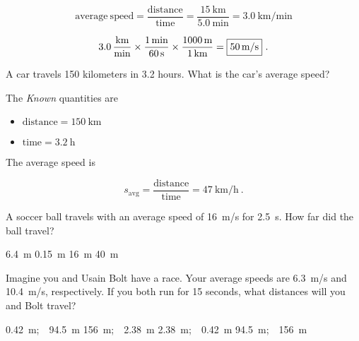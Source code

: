 \documentclass[]{exam}
\begin{document}
\begin{questions}
\begin{questions}
\begin{solution}
\begin{equation*}
    \mathrm{average\ speed = \frac{distance}{time}} = \frac{\SI{15}{\kilo\meter}}{\SI{5.0}{\minute}} = \SI[per-mode=fraction]{3.0}{\kilo\meter\per\minute}
\end{equation*}

\begin{equation*}
    \SI[per-mode=fraction]{3.0}{\kilo\meter\per\minute} \times \frac{\SI{1}{\minute}}{\SI{60}{\second}} \times \frac{\SI{1000}{\meter}}{\SI{1}{\kilo\meter}} = \framebox{\SI{50}{\meter/\second}}\ .
\end{equation*}
\end{solution}


\question
A car travels 150 kilometers in 3.2 hours. What is the car's average speed?

\begin{solution}
The \textit{Known} quantities are

\begin{itemize}
    \item $\mathrm{distance} = \SI{150}{\km}$
    \item $\mathrm{time} = \SI{3.2}{\hour}$
\end{itemize}

The average speed is

\begin{equation*}
    s_{\mathrm{avg}} = \mathrm{\frac{distance}{time}} = \SI[per-mode=symbol]{47}{\km\per\hour}\ .
\end{equation*}
\end{solution}

\question
A soccer ball travels with an average speed of \SI{16}{m/s} for \SI{2.5}{s}. How far did the ball travel?

\begin{choices}
    \choice \SI{6.4}{m}
    \choice \SI{0.15}{m}
    \choice \SI{16}{m}
    \correctchoice \SI{40}{m}
\end{choices}

\question
Imagine you and Usain Bolt have a race. Your average speeds are \SI{6.3}{m/s} and \SI{10.4}{m/s}, respectively. If you both run for 15 seconds, what distances will you and Bolt travel?

\begin{choices}
    \choice  \SI{0.42}{m};\ \ \SI{94.5}{m}
    \choice  \SI{156}{m};\ \ \SI{2.38}{m}
    \choice  \SI{2.38}{m};\ \ \SI{0.42}{m}
    \correctchoice \SI{94.5}{m};\ \ \SI{156}{m} 
\end{choices}


\end{questions}
\end{questions}
\end{document}
